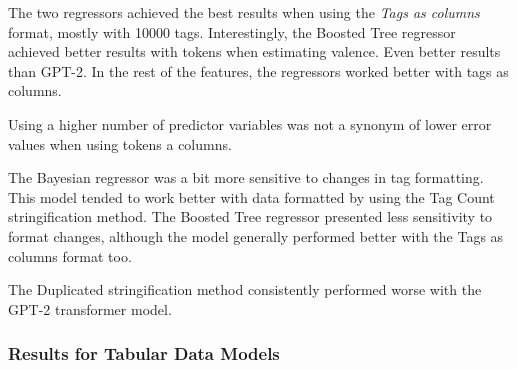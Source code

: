 \documentclass[sn-mathphys]{sn-jnl}%
\theoremstyle{thmstyleone}%
\theoremstyle{thmstyletwo}%
\theoremstyle{thmstylethree}%
\begin{document}
The two regressors achieved the best results when using the \emph{Tags as columns} format, mostly with \num{10000} tags.
Interestingly, the Boosted Tree regressor achieved better results with tokens when estimating valence.
Even better results than GPT-2.
In the rest of the features, the regressors worked better with tags as columns.

Using a higher number of predictor variables was not a synonym of lower error values when using tokens a columns.

The Bayesian regressor was a bit more sensitive to changes in tag formatting.
This model tended to work better with data formatted by using the Tag Count stringification method.
The Boosted Tree regressor presented less sensitivity to format changes, although the model generally performed better with the Tags as columns format too.

The Duplicated stringification method consistently performed worse with the GPT-2 transformer model.



\subsubsection{Results for Tabular Data Models}
\end{document}
